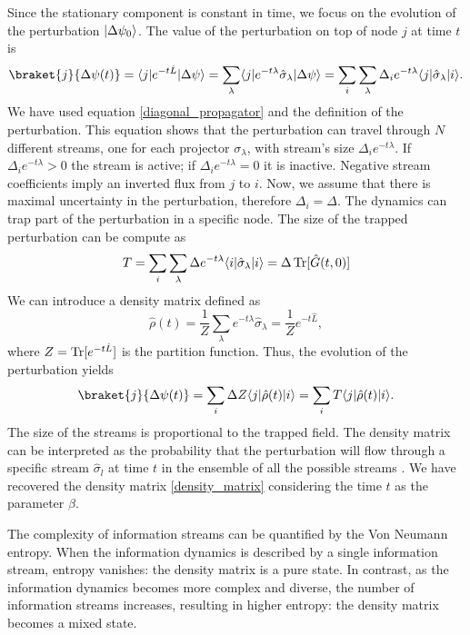Since the stationary component is constant in time, we focus on the evolution of the perturbation $\lvert\Delta\psi_0\rangle$. 
The value of the perturbation on top of node $j$ at time $t$ is
\begin{equation}
    \braket{j}{\Delta\psi(t)} = \bra{j} e^{-t\hat L} \ket{\Delta\psi} =\sum_\lambda \bra{j} e^{-t\lambda} \hat \sigma_\lambda\ket{\Delta\psi} = \sum_i  \sum_\lambda \Delta_i e^{-t\lambda} \bra{j}  \hat \sigma_\lambda \ket{i}.
\end{equation}
We have used equation \eqref{diagonal_propagator} and the definition of the perturbation.
This equation shows that the perturbation can travel through $N$ different streams, one for each projector $\sigma_\lambda$, with stream's size $\Delta_i e^{-t\lambda}$. If $\Delta_i e^{-t\lambda} > 0$ the stream is active; if $\Delta_i e^{-t\lambda} = 0$ it is inactive. Negative stream coefficients imply an inverted flux from $j$ to $i$.
Now, we assume that there is maximal uncertainty in the perturbation, therefore $\Delta_i = \Delta$.
The dynamics can trap part of the perturbation in a specific node. The size of the trapped perturbation can be compute as
\begin{equation}\label{T_equation}
    T = \sum_i  \sum_\lambda \Delta e^{-t\lambda} \langle i\rvert  \hat \sigma_\lambda \lvert i\rangle = \Delta \operatorname{Tr} [\hat G(t,0)]
\end{equation} 
We can introduce a density matrix defined as
\begin{equation}
    \hat\rho(t) = \frac{1}{Z}\sum_\lambda  e^{-t\lambda} \hat \sigma_\lambda = \frac{1}{Z} e^{-t\hat L},
\end{equation}
where $Z = \operatorname{Tr}[e^{-t\hat L}] $ is the partition function.
Thus, the evolution of the perturbation yields
\begin{equation}
    \braket{j}{\Delta\psi(t)} = \sum_i \Delta Z \bra{j}\hat\rho(t) \ket{i} = \sum_i T\bra{j}\hat\rho(t) \ket{i}.
\end{equation}
The size of the streams is proportional to the trapped field.
The density matrix can be interpreted as the probability that the perturbation will flow through a specific stream $\hat \sigma_l$ at time $t$ in the ensemble of all the possible streams \cite{De_Domenico_2020}. We have recovered the density matrix \eqref{density_matrix} considering the time $t$ as the parameter $\beta$.

The complexity of information streams can be quantified by the Von Neumann entropy.
When the information dynamics is described by a single information stream, entropy vanishes: the density matrix is a pure state.
In contrast, as the information dynamics becomes more complex and diverse, the number of information streams increases, resulting in higher entropy: the density matrix becomes a mixed state.

